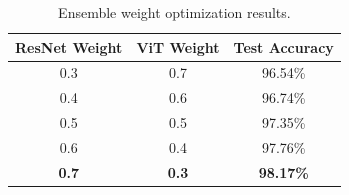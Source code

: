 \documentclass[12pt]{report}
\begin{document}
\begin{table}[h]
\centering
\caption{Ensemble weight optimization results.}
\label{tab:appendix_weights}
\begin{tabular}{ccc}
\hline
\textbf{ResNet Weight} & \textbf{ViT Weight} &
\textbf{Test Accuracy} \\
\hline
0.3 & 0.7 & 96.54\% \\
0.4 & 0.6 & 96.74\% \\
0.5 & 0.5 & 97.35\% \\
0.6 & 0.4 & 97.76\% \\
\textbf{0.7} & \textbf{0.3} & \textbf{98.17\%} \\
\hline
\end{tabular}
\end{table}
\end{document}
